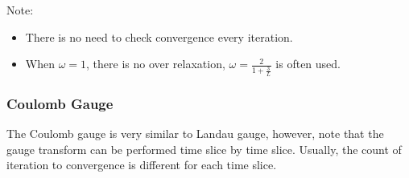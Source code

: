 Note:
\begin{itemize}
  \item There is no need to check convergence every iteration.
  \item When $\omega = 1$, there is no over relaxation, $\omega = \frac{2}{1+\frac{3}{L}}$ is often used.
\end{itemize}

\subsubsection{\label{sec:CoulombGauge}Coulomb Gauge}

The Coulomb gauge is very similar to Landau gauge, however, note that the gauge transform can be performed time slice by time slice. Usually, the count of iteration to convergence is different for each time slice.

